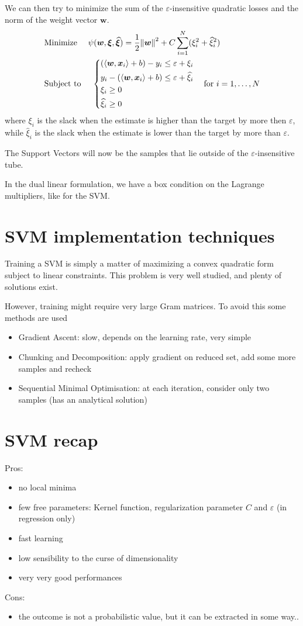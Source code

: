 \documentclass[oneside,onecolumn]{report}
\newcommand{\eps}{\varepsilon}
\newcommand{\inp}[2]{\left\langle #1, #2 \right\rangle}
\begin{document}
We can then try to minimize the sum of the $\eps$-insensitive quadratic losses and the norm of the weight vector $\bm w$.
\begin{align*}
    &\text{Minimize   } \quad \psi(\bm w, \bm \xi, \widehat {\bm \xi}) = \frac{1}{2} \norm{\bm w}^2 + C \sum_{i = 1}^N (\xi_i^2 + \widehat \xi_i^2) \\
    &\text{Subject to } \quad \begin{dcases}
        (\inp{\bm w}{\bm x_i} + b) - y_i \leq \eps + \xi_i \\
        y_i - (\inp{\bm w}{\bm x_i} + b) \leq \eps + \widehat \xi_i \\
        \xi_i \geq 0 \\
        \widehat \xi_i \geq 0
    \end{dcases} \quad \text{for } i = 1, \dots, N
\end{align*}
where $\xi_i$ is the slack when the estimate is higher than the target by more then $\eps$, while $\widehat \xi_i$ is the slack when the estimate is lower than the target by more than $\eps$.

The Support Vectors will now be the samples that lie outside of the $\eps$-insensitive tube.

In the dual linear formulation, we have a box condition on the Lagrange multipliers, like for the SVM.


\section{SVM implementation techniques}
Training a SVM is simply a matter of maximizing a convex quadratic form subject to linear constraints.
This problem is very well studied, and plenty of solutions exist.

However, training might require very large Gram matrices.
To avoid this some methods are used
\begin{itemize}
    \item Gradient Ascent: slow, depends on the learning rate, very simple
    \item Chunking and Decomposition: apply gradient on reduced set, add some more samples and recheck
    \item Sequential Minimal Optimisation: at each iteration, consider only two samples (has an analytical solution)
\end{itemize}

\section{SVM recap}
Pros:
\begin{itemize}
    \item no local minima
    \item few free parameters: Kernel function, regularization parameter $C$ and $\eps$ (in regression only)
    \item fast learning
    \item low sensibility to the curse of dimensionality
    \item very very good performances
\end{itemize}

Cons:
\begin{itemize}
    \item the outcome is not a probabilistic value, but it can be extracted in some way..
\end{itemize}
\end{document}
